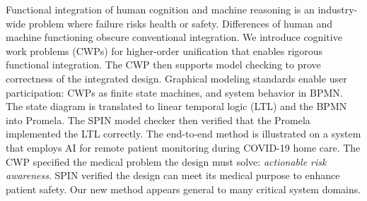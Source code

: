 Functional integration of human cognition and machine reasoning is an industry-wide problem where failure risks health or safety.
Differences of human and machine functioning obscure conventional integration. 
We introduce cognitive work problems (CWPs) for higher-order unification that enables rigorous functional integration. 
The CWP then supports model checking to prove correctness of the integrated design. 
Graphical modeling standards enable user participation: CWPs as finite state machines, and system behavior in BPMN. 
The state diagram is translated to linear temporal logic (LTL) and the BPMN into Promela. 
The SPIN model checker then verified that the Promela implemented the LTL correctly. 
The end-to-end method is illustrated on a system that employs AI for remote patient monitoring during COVID-19 home care. 
The CWP specified the medical problem the design must solve: \emph{actionable risk awareness}. SPIN verified the design can meet its medical purpose to enhance patient safety. 
Our new method appears general to many critical system domains.